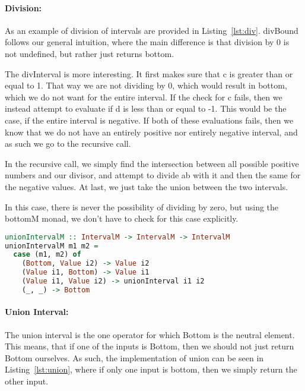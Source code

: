 \paragraph{Division:}
As an example of division of intervals are provided in Listing~\ref{lst:div}.
divBound follows our general intuition, where the main difference is that
division by 0 is not undefined, but rather just returns bottom. 

The divInterval is more interesting. It first makes sure that c is greater than
or equal to 1. That way we are not dividing by 0, which would result in bottom,
which we do not want for the entire interval. If the check for c fails, then we
instead attempt to evaluate if d is less than or equal to -1. This would be the
case, if the entire interval is negative. If both of these evaluations fails,
then we know that we do not have an entirely positive nor entirely negative
interval, and as such we go to the recursive call. 

In the recursive call, we simply find the intersection between all possible
positive numbers and our divisor, and attempt to divide ab with it and then the
same for the negative values. At last, we just take the union between the two
intervals.

In this case, there is never the possibility of dividing by zero, but using the
bottomM monad, we don't have to check for this case explicitly.


\begin{lstlisting}[language={haskell}, caption={Union interval implementation}, label={lst:union}]
unionIntervalM :: IntervalM -> IntervalM -> IntervalM
unionIntervalM m1 m2 =
  case (m1, m2) of
    (Bottom, Value i2) -> Value i2
    (Value i1, Bottom) -> Value i1
    (Value i1, Value i2) -> unionInterval i1 i2
    (_, _) -> Bottom
\end{lstlisting}
\paragraph{Union Interval:} The union interval is the one operator for which Bottom is the neutral element.
This means, that if one of the inputs is Bottom, then we should not just return
Bottom ourselves. As such, the implementation of union can be seen in
Listing~\ref{lst:union}, where if only one input is bottom, then we simply
return the other input.


